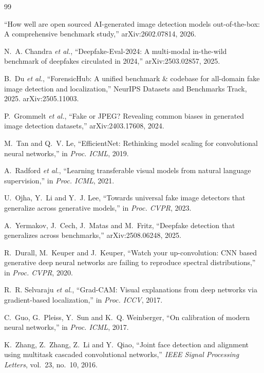\documentclass[11pt,a4paper]{article}
\begin{document}
\clearpage
{}
{}
\begin{thebibliography}{99}
\small

``How well are open sourced AI-generated image detection models out-of-the-box: A comprehensive
benchmark study,'' arXiv:2602.07814, 2026.

N.~A. Chandra \emph{et al.}, ``Deepfake-Eval-2024: A multi-modal in-the-wild benchmark of
deepfakes circulated in 2024,'' arXiv:2503.02857, 2025.

B.~Du \emph{et al.}, ``ForensicHub: A unified benchmark \& codebase for all-domain fake image
detection and localization,'' NeurIPS Datasets and Benchmarks Track, 2025. arXiv:2505.11003.

P.~Grommelt \emph{et al.}, ``Fake or JPEG? Revealing common biases in generated image detection
datasets,'' arXiv:2403.17608, 2024.

M.~Tan and Q.~V. Le, ``EfficientNet: Rethinking model scaling for convolutional neural
networks,'' in \emph{Proc. ICML}, 2019.

A.~Radford \emph{et al.}, ``Learning transferable visual models from natural language
supervision,'' in \emph{Proc. ICML}, 2021.

U.~Ojha, Y.~Li and Y.~J. Lee, ``Towards universal fake image detectors that generalize across
generative models,'' in \emph{Proc. CVPR}, 2023.

A.~Yermakov, J.~Cech, J.~Matas and M.~Fritz, ``Deepfake detection that generalizes across
benchmarks,'' arXiv:2508.06248, 2025.

R.~Durall, M.~Keuper and J.~Keuper, ``Watch your up-convolution: CNN based generative deep neural
networks are failing to reproduce spectral distributions,'' in \emph{Proc. CVPR}, 2020.

R.~R. Selvaraju \emph{et al.}, ``Grad-CAM: Visual explanations from deep networks via
gradient-based localization,'' in \emph{Proc. ICCV}, 2017.

C.~Guo, G.~Pleiss, Y.~Sun and K.~Q. Weinberger, ``On calibration of modern neural networks,'' in
\emph{Proc. ICML}, 2017.

K.~Zhang, Z.~Zhang, Z.~Li and Y.~Qiao, ``Joint face detection and alignment using multitask
cascaded convolutional networks,'' \emph{IEEE Signal Processing Letters}, vol.~23, no.~10, 2016.


\end{thebibliography}
\end{document}
